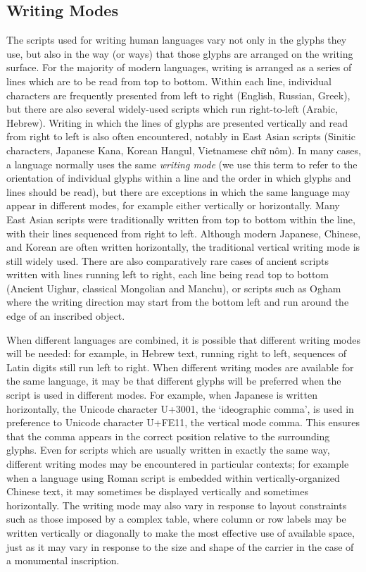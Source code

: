 \subsection[{Writing Modes}]{Writing Modes}\label{WDWM}\par
The scripts used for writing human languages vary not only in the glyphs they use, but also in the way (or ways) that those glyphs are arranged on the writing surface. For the majority of modern languages, writing is arranged as a series of lines which are to be read from top to bottom. Within each line, individual characters are frequently presented from left to right (English, Russian, Greek), but there are also several widely-used scripts which run right-to-left (Arabic, Hebrew). Writing in which the lines of glyphs are presented vertically and read from right to left is also often encountered, notably in East Asian scripts (Sinitic characters, Japanese Kana, Korean Hangul, Vietnamese chữ nôm). In many cases, a language normally uses the same \textit{writing mode} (we use this term to refer to the orientation of individual glyphs within a line and the order in which glyphs and lines should be read), but there are exceptions in which the same language may appear in different modes, for example either vertically or horizontally. Many East Asian scripts were traditionally written from top to bottom within the line, with their lines sequenced from right to left. Although modern Japanese, Chinese, and Korean are often written horizontally, the traditional vertical writing mode is still widely used. There are also comparatively rare cases of ancient scripts written with lines running left to right, each line being read top to bottom (Ancient Uighur, classical Mongolian and Manchu), or scripts such as Ogham where the writing direction may start from the bottom left and run around the edge of an inscribed object.\par
When different languages are combined, it is possible that different writing modes will be needed: for example, in Hebrew text, running right to left, sequences of Latin digits still run left to right. When different writing modes are available for the same language, it may be that different glyphs will be preferred when the script is used in different modes. For example, when Japanese is written horizontally, the Unicode character U+3001, the ‘ideographic comma’, is used in preference to Unicode character U+FE11, the vertical mode comma. This ensures that the comma appears in the correct position relative to the surrounding glyphs. Even for scripts which are usually written in exactly the same way, different writing modes may be encountered in particular contexts; for example when a language using Roman script is embedded within vertically-organized Chinese text, it may sometimes be displayed vertically and sometimes horizontally. The writing mode may also vary in response to layout constraints such as those imposed by a complex table, where column or row labels may be written vertically or diagonally to make the most effective use of available space, just as it may vary in response to the size and shape of the carrier in the case of a monumental inscription.\par
